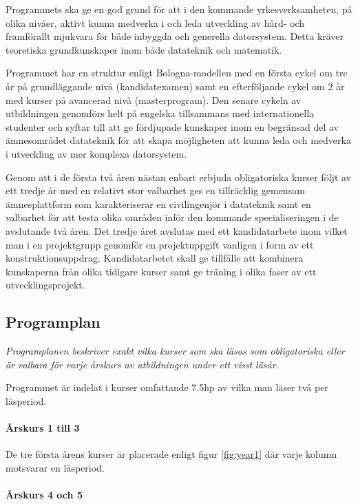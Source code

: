 \documentclass[twocolumn]{article}
\newcommand{\meta}[1]{{\small \emph{#1}}}
\begin{document}
Programmets ska ge en god grund för att i den kommande
yrkesverksamheten, på olika nivåer, aktivt kunna medverka i och leda
utveckling av hård- och framförallt mjukvara för både inbyggda och
generella datorsystem. Detta kräver teoretiska grundkunskaper inom
både datateknik och matematik.

Programmet har en struktur enligt Bologna-modellen med en första cykel
om tre år på grundläggande nivå (kandidatexamen) samt en efterföljande
cykel om 2 år med kurser på avancerad nivå (masterprogram). Den senare
cykeln av utbildningen genomförs helt på engelska tillsammans med
internationella studenter och syftar till att ge fördjupade kunskaper
inom en begränsad del av ämnesområdet datateknik för att skapa
möjligheten att kunna leda och medverka i utveckling av mer komplexa
datorsystem.

Genom att i de första två åren nästan enbart erbjuda obligatoriska
kurser följt av ett tredje år med en relativt stor valbarhet ges en
tillräcklig gemensam ämnesplattform som karakteriserar en
civilingenjör i datateknik samt en valbarhet för att testa olika
områden inför den kommande specialiseringen i de avslutande två åren.
Det tredje året avslutas med ett kandidatarbete inom vilket man i en
projektgrupp genomför en projektuppgift vanligen i form av ett
konstruktionsuppdrag. Kandidatarbetet skall ge tillfälle att kombinera
kunskaperna från olika tidigare kurser samt ge träning i olika faser
av ett utvecklingsprojekt.

\subsection{Programplan}

\meta{Programplanen beskriver exakt vilka kurser som ska läsas som
  obligatoriska eller är valbara för varje årskurs av utbildningen
  under ett visst läsår.}

Programmet är indelat i kurser omfattande 7.5hp av vilka man läser
två per läsperiod.
\paragraph{Årskurs 1 till 3} De tre första årens kurser är placerade
enligt figur \ref{fig:year1} där varje kolumn motsvarar en läsperiod.

\paragraph{Årskurs 4 och 5}
\end{document}
